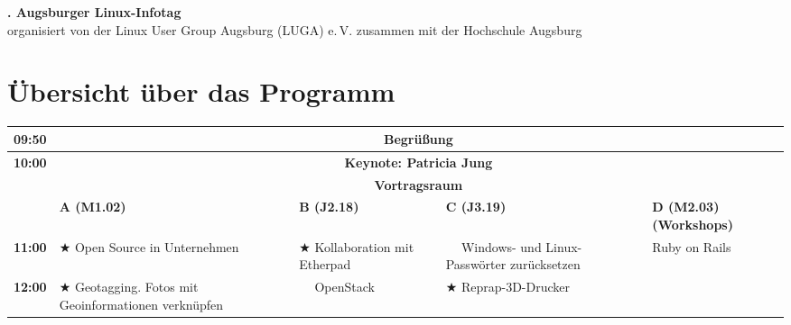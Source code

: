 \documentclass[10pt,a4paper,ngerman,landscape]{scrartcl}
\begin{document}
\begin{center}
     {\huge \textbf{. Augsburger Linux-Infotag}}\\[2ex]
     organisiert von der Linux User Group Augsburg (LUGA) e.\,V. zusammen
     mit der Hochschule Augsburg
\end{center}

\vspace{2ex}

\section{Übersicht über das Programm}
{
\begin{table}[h!]
   \small\sffamily
        \begin{center}
        \begin{tabular}{|c||l|l|l||l|} \hline
            \bfseries{09:50} & \multicolumn{4}{c|}{\rule[-3mm]{0mm}{8mm}{\bfseries{Begrüßung}}}  \\ \hline
            \bfseries{10:00} &
            \multicolumn{4}{c|}{\rule[-3mm]{0mm}{8mm}{\bfseries Keynote: Patricia Jung}}\\ \hline
                             & \multicolumn{4}{c|}{\rule[-3mm]{0mm}{8mm}{\bfseries{Vortragsraum}}} \\ \cline{2-5} 
                             & \rule[-3mm]{0mm}{8mm}\bfseries{A (M1.02)}
                             & \bfseries{B (J2.18)} & \bfseries{C (J3.19) } & \bfseries{D (M2.03)} (Workshops) \\ \hline  \hline  
            \bfseries{11:00} & \rule[-3mm]{0mm}{8mm} $\bigstar$ Open Source in Unternehmen &
                                                     $\bigstar$ Kollaboration mit Etherpad &
                                                     $\phantom{\bigstar}$
                                                     Windows- und Linux-Passwörter zurücksetzen &
                                                     \multirow{3}{*}{Ruby on Rails} \\
                                                     \cline{1-4}
            \bfseries{12:00} & \rule[-3mm]{0mm}{8mm} $\bigstar$ Geotagging. Fotos mit Geoinformationen verknüpfen &
                                                     $\phantom{\bigstar}$ OpenStack &
                                                     $\bigstar$ Reprap-3D-Drucker &
                                                     \\ \hline

\end{tabular}
\end{center}
\end{table}}
\end{document}

